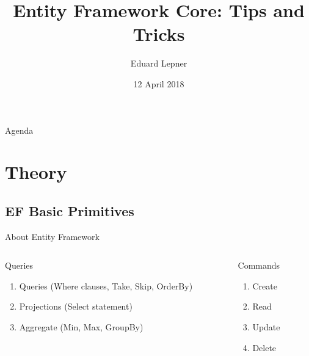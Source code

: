 \documentclass{bredelebeamer}
\title[EFC Tips \& Tricks]{Entity Framework Core: Tips and Tricks}
\author{Eduard Lepner\inst{1}}
\institute[Powel]
{
  \inst{1}%
  Powel AS\\
  Team Leader at Powel Water
  }
\date{12 April 2018}
\begin{document}
\begin{frame}
  \titlepage
\end{frame}

\begin{frame}{Agenda}
  \tableofcontents
\end{frame}

\section{Theory}
\subsection{EF Basic Primitives}
\begin{frame} {About Entity Framework}
    \begin{columns}[t]
        \begin{column}{0.5\textwidth}
            Queries\\[.2cm]
            \begin{enumerate}
                \item Queries (Where clauses, Take, Skip, OrderBy)
                \item Projections (Select statement)
                \item Aggregate (Min, Max, GroupBy)
            \end{enumerate}
            
        \end{column}
        \begin{column}{0.5\textwidth}
            Commands\\[.2cm]
            \begin{enumerate}
                \item Create
                \item Read
                \item Update
                \item Delete
            \end{enumerate}
        \end{column}
    \end{columns}
\end{frame}
\end{document}
